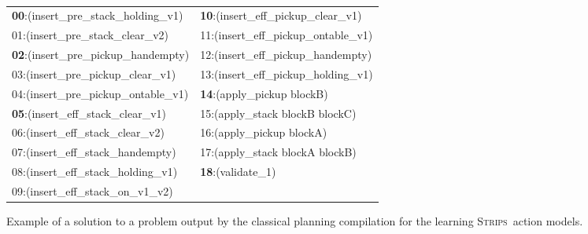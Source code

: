 \documentclass{article}
\newcommand{\strips}{\textsc{Strips}}
\begin{document}
\begin{figure}[hbt!]
	{\tiny\tt
\begin{tabular}{ll}
		{\bf 00}:(insert\_pre\_stack\_holding\_v1) & {\bf 10}:(insert\_eff\_pickup\_clear\_v1) \\
		01:(insert\_pre\_stack\_clear\_v2) & 11:(insert\_eff\_pickup\_ontable\_v1)\\
                {\bf 02}:(insert\_pre\_pickup\_handempty) & 12:(insert\_eff\_pickup\_handempty)\\
                03:(insert\_pre\_pickup\_clear\_v1) & 13:(insert\_eff\_pickup\_holding\_v1)\\
                04:(insert\_pre\_pickup\_ontable\_v1) & {\bf 14}:(apply\_pickup blockB)\\
                {\bf 05}:(insert\_eff\_stack\_clear\_v1) & 15:(apply\_stack blockB blockC)\\
                06:(insert\_eff\_stack\_clear\_v2) & 16:(apply\_pickup blockA)\\
                07:(insert\_eff\_stack\_handempty) & 17:(apply\_stack blockA blockB) \\
                08:(insert\_eff\_stack\_holding\_v1) &  {\bf 18}:(validate\_1)\\
                09:(insert\_eff\_stack\_on\_v1\_v2) &             		
\end{tabular}
}
	\caption{\small Example of a solution to a problem output by the classical planning compilation for the learning \strips\ action models.}
	\label{fig:plan-lplan}
\end{figure}

\end{document}
